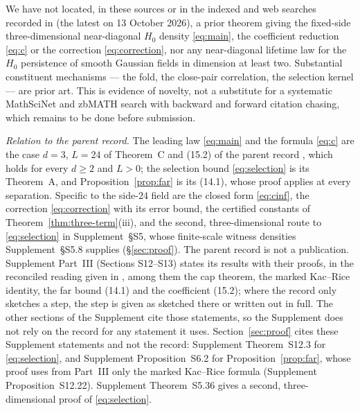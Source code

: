 We have not located, in these sources or in the indexed and web searches recorded in  (the latest on 13 October 2026), a prior theorem giving the fixed-side three-dimensional near-diagonal $H_0$ density \eqref{eq:main}, the coefficient reduction \eqref{eq:c} or the correction \eqref{eq:correction}, nor any near-diagonal lifetime law for the $H_0$ persistence of smooth Gaussian fields in dimension at least two. Substantial constituent mechanisms --- the fold, the close-pair correlation, the selection kernel --- are prior art. This is evidence of novelty, not a substitute for a systematic MathSciNet and zbMATH search with backward and forward citation chasing, which remains to be done before submission.

\emph{Relation to the parent record.} The leading law \eqref{eq:main} and the formula \eqref{eq:c} are the case $d=3$, $L=24$ of Theorem~C and (15.2) of the parent record , which holds for every $d\ge2$ and $L>0$; the selection bound \eqref{eq:selection} is its Theorem~A, and Proposition~\ref{prop:far} is its (14.1), whose proof applies at every separation. Specific to the side-$24$ field are the closed form \eqref{eq:cinf}, the correction \eqref{eq:correction} with its error bound, the certified constants of Theorem~\ref{thm:three-term}(iii), and the second, three-dimensional route to \eqref{eq:selection} in Supplement~\S S5, whose finite-scale witness densities Supplement~\S S5.8 supplies (\S\ref{sec:proof}). The parent record is not a publication. Supplement Part~III (Sections S12--S13) states its results with their proofs, in the reconciled reading given in , among them the cap theorem, the marked Kac--Rice identity, the far bound (14.1) and the coefficient (15.2); where the record only sketches a step, the step is given as sketched there or written out in full. The other sections of the Supplement cite those statements, so the Supplement does not rely on the record for any statement it uses. Section~\ref{sec:proof} cites these Supplement statements and not the record: Supplement Theorem~S12.3 for \eqref{eq:selection}, and Supplement Proposition~S6.2 for Proposition~\ref{prop:far}, whose proof uses from Part~III only the marked Kac--Rice formula (Supplement Proposition~S12.22). Supplement Theorem~S5.36 gives a second, three-dimensional proof of \eqref{eq:selection}.

